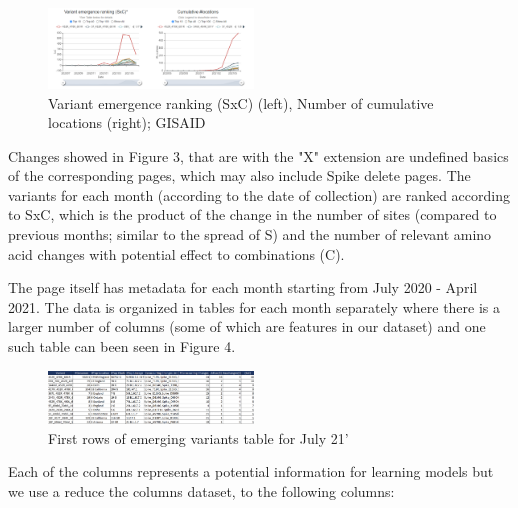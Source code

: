 \documentclass[conference,compsoc]{IEEEtran}
\begin{document}
\begin{figure}[h]
    \centering
    \includegraphics[width=0.485\textwidth]{images/fig3-variants_ranking.png}
    \caption{Variant emergence ranking (SxC) (left), Number of cumulative locations (right); GISAID}
    \label{fig3}
\end{figure}


Changes showed in Figure 3, that are with the "X" extension are undefined basics of the corresponding pages, which may also include Spike delete pages. The variants for each month (according to the date of collection) are ranked according to SxC, which is the product of the change in the number of sites (compared to previous months; similar to the spread of S) and the number of relevant amino acid changes with potential effect to combinations (C). 
\hspace{0pt}

The page itself has metadata for each month starting from July 2020 - April 2021. The data is organized in tables for each month separately where there is a larger number of columns (some of which are features in our dataset) and one such table can been seen in Figure 4. 

\begin{figure}[h]
    \centering
    \includegraphics[width=0.485\textwidth]{images/fig4-dataset.png}
    \caption{First rows of emerging variants table for July 21'}
    \label{fig4}
\end{figure}

Each of the columns represents a potential information for learning models but we use a reduce the columns dataset, to the following columns: 
\end{document}
